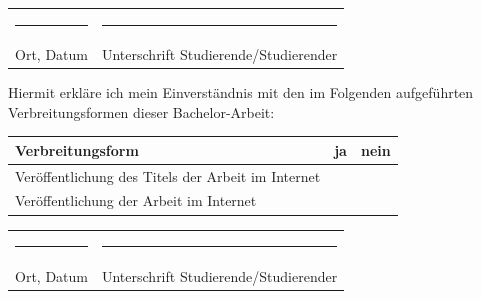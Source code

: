 \documentclass[11pt,a4paper,ngerman]{report}
\begin{document}
\vspace{2cm}

\noindent
\begin{tabular}{p{5.5cm}p{7cm}}
\rule{4.5cm}{0.4pt} & \rule{6cm}{0.4pt} \\[0.2em]
Ort, Datum & Unterschrift Studierende/Studierender \\
\end{tabular}

\newpage
\thispagestyle{plain}

\noindent Hiermit erkläre ich mein Einverständnis mit den im Folgenden aufgeführten Verbreitungsformen dieser Bachelor-Arbeit:

\vspace{0.4cm}

\noindent
\begin{tabular}{|p{9cm}|c|c|}
\hline
\textbf{Verbreitungsform} & \textbf{ja} & \textbf{nein} \\[0.3em]
\hline
Veröffentlichung des Titels der Arbeit im Internet & & \\[0.5em]
\hline
Veröffentlichung der Arbeit im Internet & & \\[0.5em]
\hline
\end{tabular}

\vspace{1.5cm}

\noindent
\begin{tabular}{p{5.5cm}p{7cm}}
\rule{4.5cm}{0.4pt} & \rule{6cm}{0.4pt} \\[0.2em]
Ort, Datum & Unterschrift Studierende/Studierender \\
\end{tabular}

\clearpage
\tableofcontents

\end{document}
